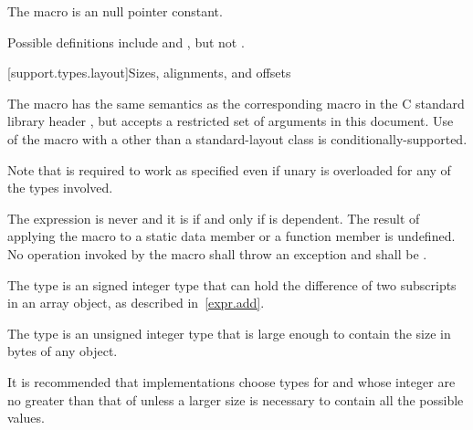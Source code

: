 \pnum
The macro
%
is an  null pointer constant.
\begin{footnote}
Possible definitions include
and
,
but not
.
\end{footnote}


[support.types.layout]{Sizes, alignments, and offsets}

\pnum
The macro
%
has the same semantics as the corresponding macro in
the C standard library header , but
accepts a restricted set of 
arguments in this document.
Use of the  macro with a 
other than a standard-layout class
is conditionally-supported.
\begin{footnote}
Note that 
is required to work as specified even if unary
is overloaded for any of the types involved.
\end{footnote}
The expression 
is never  and it is
 if and only if  is
dependent. The result of applying the  macro to
a static data member or a function member is undefined.
No operation invoked by the  macro shall throw an exception and
 shall be .

\pnum
The type  is an
signed integer type that can
hold the difference of two subscripts in an array object, as described in~\ref{expr.add}.

\pnum
The type  is an
unsigned integer type that is large enough
to contain the size in bytes of any object.

\pnum
\begin{note}
It is recommended that implementations choose types for  and 
whose integer  are no greater than that of
 unless a larger size is necessary to contain all the possible values.
\end{note}

